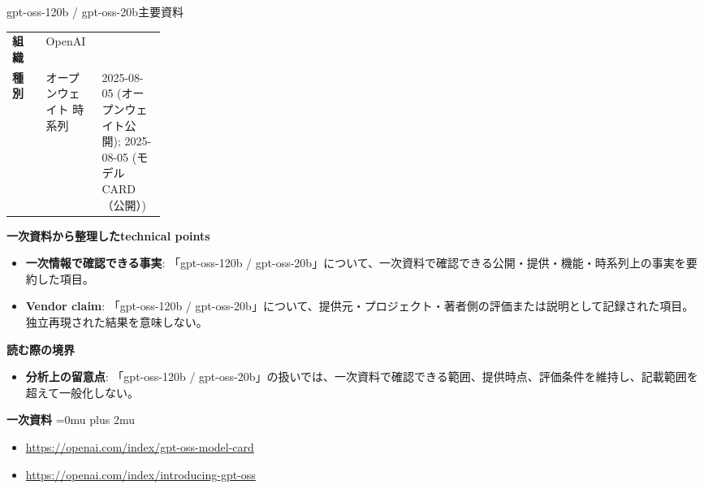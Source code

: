 \begin{technicalnote}{gpt-oss-120b / gpt-oss-20b}{主要資料}
\begingroup
\begin{tabularx}{\linewidth}{@{}>{\bfseries}p{0.22\linewidth}X@{}}
組織 & OpenAI \\
種別 & オープンウェイト
時系列 & 2025-08-05 (オープンウェイト公開); 2025-08-05 (モデル CARD（公開）) \\
\end{tabularx}
\smallskip
{\bfseries 一次資料から整理したtechnical points}
\begin{itemize}[leftmargin=1.5em,itemsep=0.35em]
\item \textbf{一次情報で確認できる事実}: 「gpt-oss-120b / gpt-oss-20b」について、一次資料で確認できる公開・提供・機能・時系列上の事実を要約した項目。
\item \textbf{Vendor claim}: 「gpt-oss-120b / gpt-oss-20b」について、提供元・プロジェクト・著者側の評価または説明として記録された項目。独立再現された結果を意味しない。
\end{itemize}
\begin{minipage}{\linewidth}
{\bfseries 読む際の境界}
\begin{itemize}[leftmargin=1.5em,itemsep=0.35em]
\item \textbf{分析上の留意点}: 「gpt-oss-120b / gpt-oss-20b」の扱いでは、一次資料で確認できる範囲、提供時点、評価条件を維持し、記載範囲を超えて一般化しない。
\end{itemize}
\begin{samepage}
{\bfseries 一次資料}
\begingroup\sloppy
\Urlmuskip=0mu plus 2mu\relax
\begin{itemize}[leftmargin=1.5em,itemsep=0.25em]
\item {\scriptsize\url{https://openai.com/index/gpt-oss-model-card}}
\item {\scriptsize\url{https://openai.com/index/introducing-gpt-oss}}
\end{itemize}
\endgroup
\end{samepage}
\end{minipage}
\endgroup
\end{technicalnote}
\medskip

